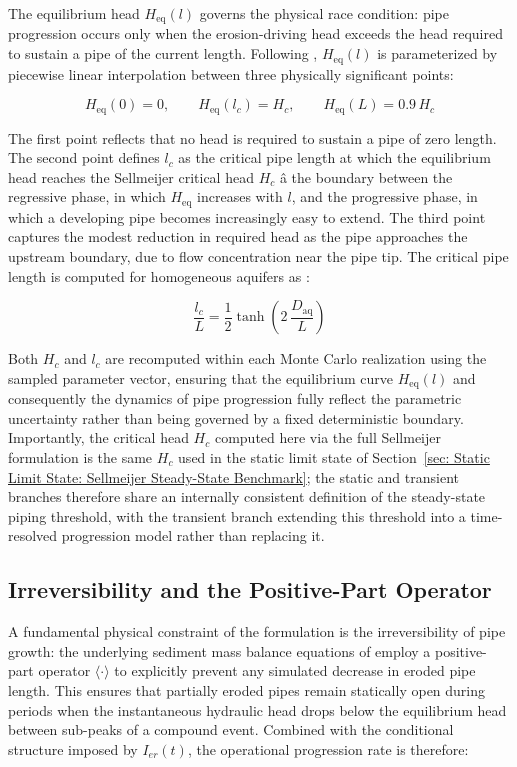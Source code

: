The equilibrium head $H_\mathrm{eq}(l)$ governs the physical race condition: pipe progression occurs only when the erosion-driving head exceeds the head required to sustain a pipe of the current length. Following \textcite{pol_sie_2024}, $H_\mathrm{eq}(l)$ is parameterized by piecewise linear interpolation between three physically significant points:

$$H_\mathrm{eq}(0) = 0,\qquad H_\mathrm{eq}(l_c) = H_c,\qquad H_\mathrm{eq}(L) = 0.9\,H_c$$

The first point reflects that no head is required to sustain a pipe of zero length. The second point defines $l_c$ as the critical pipe length at which the equilibrium head reaches the Sellmeijer critical head $H_c$ â the boundary between the regressive phase, in which $H_\mathrm{eq}$ increases with $l$, and the progressive phase, in which a developing pipe becomes increasingly easy to extend. The third point captures the modest reduction in required head as the pipe approaches the upstream boundary, due to flow concentration near the pipe tip. The critical pipe length is computed for homogeneous aquifers as \parencite{pol_sie_2024}:

$$\frac{l_c}{L} = \frac{1}{2}\tanh\!\left(2\,\frac{D_\mathrm{aq}}{L}\right)$$

Both $H_c$ and $l_c$ are recomputed within each Monte Carlo realization using the sampled parameter vector, ensuring that the equilibrium curve $H_\mathrm{eq}(l)$ and consequently the dynamics of pipe progression fully reflect the parametric uncertainty rather than being governed by a fixed deterministic boundary. Importantly, the critical head $H_c$ computed here via the full Sellmeijer formulation is the same $H_c$ used in the static limit state of Section~\ref{sec: Static Limit State: Sellmeijer Steady-State Benchmark}; the static and transient branches therefore share an internally consistent definition of the steady-state piping threshold, with the transient branch extending this threshold into a time-resolved progression model rather than replacing it.

\subsection{Irreversibility and the Positive-Part Operator}
\label{subsec: Irreversibility and the Positive-Part Operator}

A fundamental physical constraint of the formulation is the irreversibility of pipe growth: the underlying sediment mass balance equations of \textcite{pol_compgeo_2024} employ a positive-part operator $\langle\cdot\rangle$ to explicitly prevent any simulated decrease in eroded pipe length. This ensures that partially eroded pipes remain statically open during periods when the instantaneous hydraulic head drops below the equilibrium head between sub-peaks of a compound event. Combined with the conditional structure imposed by $I_{er}(t)$, the operational progression rate is therefore:

